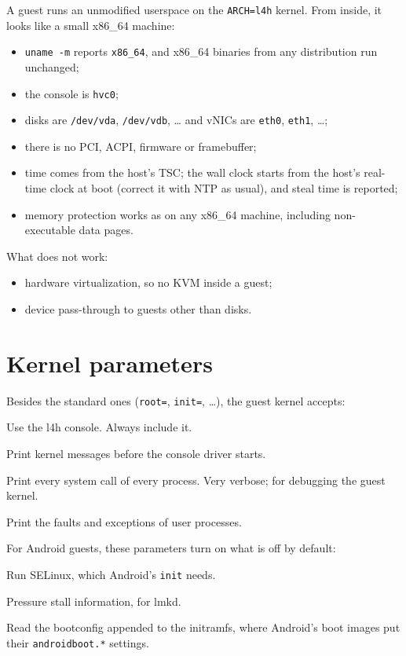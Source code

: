 \documentclass[11pt,a4paper]{report}
\newcommand{\file}[1]{\texttt{#1}}
\begin{document}
A guest runs an unmodified userspace on the \texttt{ARCH=l4h} kernel. From
inside, it looks like a small x86\_64 machine:
\begin{itemize}
  \item \texttt{uname -m} reports \texttt{x86\_64}, and x86\_64 binaries
        from any distribution run unchanged;
  \item the console is \texttt{hvc0};
  \item disks are \file{/dev/vda}, \file{/dev/vdb}, \ldots{} and vNICs are
        \texttt{eth0}, \texttt{eth1}, \ldots;
  \item there is no PCI, ACPI, firmware or framebuffer;
  \item time comes from the host's TSC; the wall clock starts from the
        host's real-time clock at boot (correct it with NTP as usual), and
        steal time is reported;
  \item memory protection works as on any x86\_64 machine, including
        non-executable data pages.
\end{itemize}

What does not work:
\begin{itemize}
  \item hardware virtualization, so no KVM inside a guest;
  \item device pass-through to guests other than disks.
\end{itemize}

\section{Kernel parameters}
\label{sec:kparams}

Besides the standard ones (\texttt{root=}, \texttt{init=}, \ldots), the
guest kernel accepts:
\begin{description}[style=nextline]
  \item[\texttt{console=hvc0}] Use the l4h console. Always include it.
  \item[\texttt{earlyprintk}] Print kernel messages before the console
    driver starts.
  \item[\texttt{l4h\_strace}] Print every system call of every process.
    Very verbose; for debugging the guest kernel.
  \item[\texttt{l4h\_debug\_user}] Print the faults and exceptions of user
    processes.
\end{description}
For Android guests, these parameters turn on what is off by
default:
\begin{description}[style=nextline]
  \item[\texttt{lsm=selinux}] Run SELinux, which Android's \texttt{init}
    needs.
  \item[\texttt{psi=1}] Pressure stall information, for lmkd.
  \item[\texttt{bootconfig}] Read the bootconfig appended to the
    initramfs, where Android's boot images put their
    \texttt{androidboot.*} settings.
\end{description}
\end{document}
